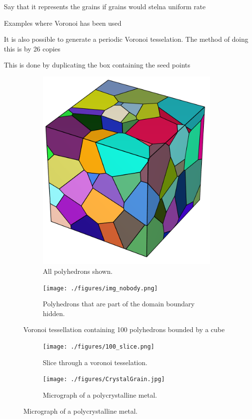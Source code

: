 \documentclass[micro_gen.tex]{subfiles}
\begin{document}
Say that it represents the grains if grains would stelna uniform rate

Examples where Voronoi has been used

It is also possible to generate a periodic Voronoi tesselation. The method of doing this is by 
26 copies

This is done by duplicating the box containing the seed points 

\cite{Fritzen2009}



\begin{figure}
\centering
\begin{subfigure}[b]{.5\textwidth}
  \centering
  \includegraphics[width=.5\linewidth]{./figures/img_body.png}
  \caption{All polyhedrons shown.}
  \label{fig:pois_voronoi_a}
\end{subfigure}%
\begin{subfigure}[b]{.5\textwidth}
  \centering
  \texttt{[image: ./figures/img\_nobody.png]}
  \caption{Polyhedrons that are part of the domain boundary hidden.}
  \label{fig:pois_voronoi_b}
\end{subfigure}
\caption{Voronoi tessellation containing 100 polyhedrons bounded by a cube}
\label{fig:pois_voronoi}
\end{figure}

\begin{figure}
\centering
\begin{subfigure}[b]{.5\textwidth}
  \centering
  \texttt{[image: ./figures/100\_slice.png]}
  \caption{Slice through a voronoi tesselation.}
   \label{fig:slice_a}
\end{subfigure}%
\begin{subfigure}[b]{.5\textwidth}
  \centering
  \texttt{[image: ./figures/CrystalGrain.jpg]}
  \caption{Micrograph of a polycrystalline metal.\cite{wiki:grain}}
  \label{fig:slice_b}
\end{subfigure}
\label{fig:pois_voronoi}
\end{figure}


\begin{figure}

\end{figure}
\end{document}
